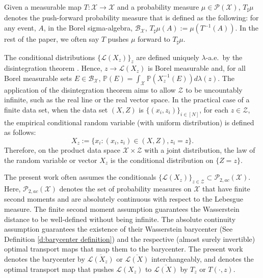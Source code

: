 \documentclass[twoside,11pt]{article}
\begin{document}
Given a measurable map $T: \mathcal{X} \rightarrow \mathcal{X}$ and a probability measure $\mu \in \mathcal{P}(\mathcal{X})$, $T_{\sharp} \mu$ denotes the push-forward probability measure that is defined as the following: for any event, $A$, in the Borel sigma-algebra, $\mathcal{B}_{\mathcal{X}}$,  $T_{\sharp} \mu(A) := \mu(T^{-1}(A))$. In the rest of the paper, we often say $T$ pushes $\mu$ forward to $T_{\sharp}\mu$.

The conditional distributions $\{\mathcal{L}(X_z)\}_z$ are defined uniquely $\lambda$-a.e.\ by the disintegration theorem \cite[Box 2.2]{santambrogio2015optimal}. Hence, $z \rightarrow \mathcal{L}(X_z)$ is Borel measurable and, for all Borel measurable sets $E \in \mathcal{B}_{\mathcal{X}}$, $\mathbb{P}(E) = \int_{\mathcal{X}}\mathbb{P}(X_z^{-1}(E)) d \lambda(z)$. The application of the disintegration theorem aims to allow $\mathcal{Z}$ to be uncountably infinite, such as the real line or the real vector space. In the practical case of a finite data set, when the data set $(X,Z)$ is $\{(x_i,z_i)\}_{i \in [N]}$, for each $z \in \mathcal{Z}$, the empirical conditional random variable (with uniform distribution) is defined as follows: $$X_z := \{x_i: (x_i,z_i) \in (X,Z), z_i = z\}.$$ Therefore, on the product data space $\mathcal{X} \times \mathcal{Z}$ with a joint distribution, the law of the random variable or vector $X_z$ is the conditional distribution on $\{Z = z\}$.

The present work often assumes the conditionals $\{\mathcal{L}(X_z)\}_{z \in \mathcal{Z}} \subset \mathcal{P}_{2,ac}(\mathcal{X})$. Here, $\mathcal{P}_{2,ac}(\mathcal{X})$ denotes the set of probability measures on $\mathcal{X}$ that have finite second moments and are absolutely continuous with respect to the Lebesgue measure.  The finite second moment assumption guarantees the Wasserstein distance to be well-defined without being infinite. The absolute continuity assumption guarantees the existence of their Wasserstein barycenter (See Definition \ref{d:barycenter definition}) and the respective (almost surely invertible) optimal transport maps that map them to the barycenter. The present work denotes the barycenter by $\overline{\mathcal{L}(X_z)}$ or $\overline{\mathcal{L}(X)}$ interchangeably, and denotes the optimal transport map that pushes $\mathcal{L}(X_z)$ to $\overline{\mathcal{L}(X)}$ by $T_z$ or $T(\cdot, z)$.
\end{document}
